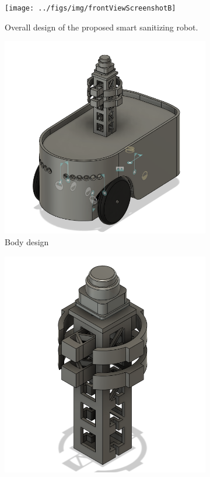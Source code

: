 \documentclass[letterpaper]{article} %
\begin{document}
\begin{figure}[htpb]
  \centering
  \begin{subfigure}[b]{0.5\textwidth}
    \centering
    \texttt{[image: ../figs/img/frontViewScreenshotB]}
    \caption{Overall design of the proposed smart sanitizing robot.}
    \label{fig:frontViewScreenshotB}
  \end{subfigure}
  \begin{subfigure}[b]{.5\textwidth}
    \centering
    \includegraphics[scale=0.3]{../figs/img/v3BodyDesign}
    \caption{Body design}
  \end{subfigure}
  \begin{subfigure}[b]{.5\textwidth}
  	\centering
  	\includegraphics[scale=0.3]{../figs/img/lidarTowerFinal}
  \end{subfigure}


\end{figure}
\end{document}
